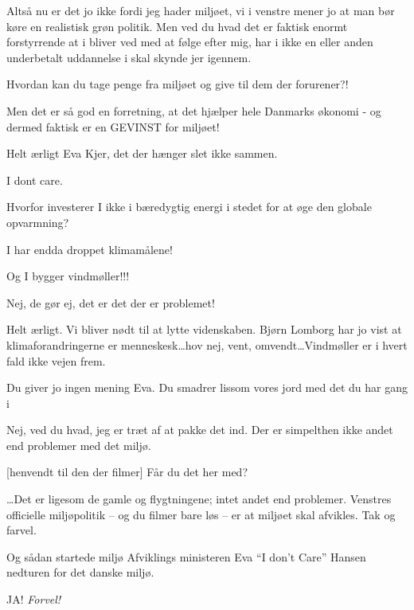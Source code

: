 \documentclass[a4paper,11pt]{article}
\begin{document}
\begin{sketch}
 Altså nu er det jo ikke fordi jeg hader miljøet, vi i venstre mener jo at man bør køre en realistisk grøn politik. Men ved du hvad det er faktisk enormt forstyrrende at i bliver ved med at følge efter mig, har i ikke en eller anden underbetalt uddannelse i skal skynde jer igennem. 

 Hvordan kan du tage penge fra miljøet og give til dem der forurener?!

 Men det er så god en forretning, at det hjælper hele Danmarks økonomi - og dermed faktisk er en GEVINST for miljøet!

 Helt ærligt Eva Kjer, det der hænger slet ikke sammen.

 I dont care.

 Hvorfor investerer I ikke i bæredygtig energi i stedet for at øge den globale opvarmning?

 I har endda droppet klimamålene!

 Og I bygger vindmøller!!!

 Nej, de gør ej, det er det der er problemet! 

 Helt ærligt. Vi bliver nødt til at lytte videnskaben. Bjørn Lomborg har jo vist at klimaforandringerne er menneskesk\ldots hov nej, vent, omvendt\ldots Vindmøller er i hvert fald ikke vejen frem. 

 Du giver jo ingen mening Eva. 
 Du smadrer lissom vores jord med det du har gang i

 Nej, ved du hvad, jeg er træt af at pakke det ind. Der er simpelthen ikke andet end problemer med det miljø.

[henvendt til den der filmer] Får du det her med? 

\ldots Det er ligesom de gamle og flygtningene; intet andet end problemer. Venstres officielle miljøpolitik -- og du filmer bare løs -- er at miljøet skal afvikles. Tak og farvel.

 Og sådan startede miljø Afviklings ministeren Eva ``I don't Care'' Hansen nedturen for det danske miljø.

 JA! \emph{Forvel!}  



\end{sketch}
\end{document}
